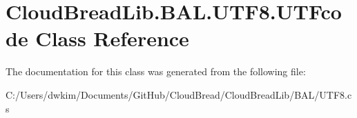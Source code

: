 \hypertarget{class_cloud_bread_lib_1_1_b_a_l_1_1_u_t_f8_1_1_u_t_fcode}{}\section{Cloud\+Bread\+Lib.\+B\+A\+L.\+U\+T\+F8.\+U\+T\+Fcode Class Reference}
\label{class_cloud_bread_lib_1_1_b_a_l_1_1_u_t_f8_1_1_u_t_fcode}


The documentation for this class was generated from the following file\+:\begin{DoxyCompactItemize}
\item 
C\+:/\+Users/dwkim/\+Documents/\+Git\+Hub/\+Cloud\+Bread/\+Cloud\+Bread\+Lib/\+B\+A\+L/U\+T\+F8.\+cs\end{DoxyCompactItemize}
